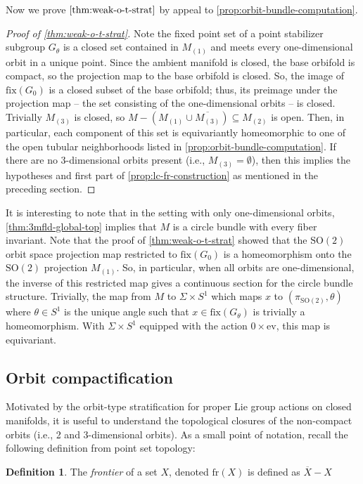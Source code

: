 \documentclass[10pt, oneside]{article}
\newcommand{\SO}[1][2]{\text{SO}(#1)}
\newcommand{\cl}[1]{\overline{#1}}
\theoremstyle{definition}
\newtheorem{defn}{Definition}[section]
\theoremstyle{definition}
\begin{document}
Now we prove $\cref{thm:weak-o-t-strat}$ by appeal to \cref{prop:orbit-bundle-computation}.

\begin{proof}[Proof of \cref{thm:weak-o-t-strat}]
    Note the fixed point set of a point stabilizer subgroup $G_\theta$ is a closed set contained in $M_{(1)}$ and meets every one-dimensional orbit in a unique point. Since the ambient manifold is closed, the base orbifold is compact, so the projection map to the base orbifold is closed. So, the image of $\text{fix}(G_0)$ is a closed subset of the base orbifold; thus, its preimage under the projection map -- the set consisting of the one-dimensional orbits -- is closed. Trivially $M_{(3)}$ is closed, so $M - (M_{(1)}\cup \cl{M_{(3)}})\subseteq M_{(2)}$ is open. Then, in particular, each component of this set is equivariantly homeomorphic to one of the open tubular neighborhoods listed in \cref{prop:orbit-bundle-computation}. If there are no 3-dimensional orbits present (i.e., $M_{(3)}=\emptyset$), then this implies the hypotheses and first part of \cref{prop:lc-fr-construction} as mentioned in the preceding section.
\end{proof}

It is interesting to note that in the setting with only one-dimensional orbits, \cref{thm:3mfld-global-top} implies that $M$ is a circle bundle with every fiber invariant. Note that the proof of \cref{thm:weak-o-t-strat} showed that the $\SO$ orbit space projection map restricted to $\text{fix}(G_0)$ is a homeomorphism onto the $\SO$ projection $M_{(1)}$. So, in particular, when all orbits are one-dimensional, the inverse of this restricted map gives a continuous section for the circle bundle structure. Trivially, the map from $M$ to $\Sigma \times S^1$  which maps $x$ to $(\pi_{\SO}, \theta)$ where $\theta\in S^1$ is the unique angle such that $x\in\text{fix}(G_\theta)$
is trivially a homeomorphism. With $\Sigma \times S^1$ equipped with the action $0\times \text{ev}$, this map is equivariant.

\subsection{Orbit compactification}
Motivated by the orbit-type stratification for proper Lie group actions on closed manifolds, it is useful to understand the topological closures of the non-compact orbits (i.e., 2 and 3-dimensional orbits). As a small point of notation, recall the following definition from point set topology:
\begin{defn}
    The {\it frontier} of a set $X$, denoted $\text{fr}(X)$ is defined as $\cl{X}-X$
\end{defn}
\end{document}

